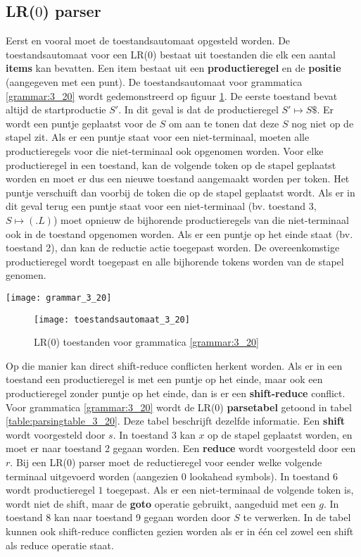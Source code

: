 \subsection{LR($0$) parser}

Eerst en vooral moet de toestandsautomaat opgesteld worden. De toestandsautomaat voor een LR(0) bestaat uit toestanden die elk een aantal \textbf{items} kan bevatten. Een item bestaat uit een \textbf{productieregel} en de \textbf{positie} (aangegeven met een punt). De toestandsautomaat voor grammatica \ref{grammar:3_20} wordt gedemonstreerd op figuur \ref{fig:toestandsautomaat_3_20}. De eerste toestand bevat altijd de startproductie $S'$. In dit geval is dat de productieregel $S' \mapsto S\$$. Er wordt een puntje geplaatst voor de $S$ om aan te tonen dat deze $S$ nog niet op de stapel zit. Als er een puntje staat voor een niet-terminaal, moeten alle productieregels voor die niet-terminaal ook opgenomen worden. Voor elke productieregel in een toestand, kan de volgende token op de stapel geplaatst worden en moet er dus een nieuwe toestand aangemaakt worden per token. Het puntje verschuift dan voorbij de token die op de stapel geplaatst wordt. Als er in dit geval terug een puntje staat voor een niet-terminaal (bv. toestand 3, $S \mapsto (.L)$) moet opnieuw de bijhorende productieregels van die niet-terminaal ook in de toestand opgenomen worden. Als er een puntje op het einde staat (bv. toestand 2), dan kan de reductie actie toegepast worden. De overeenkomstige productieregel wordt toegepast en alle bijhorende tokens worden van de stapel genomen.
\begin{grammarfigure}
	\centering
	\texttt{[image: grammar\_3\_20]}
	\caption{}
	\label{grammar:3_20}
\end{grammarfigure}
\begin{figure}[ht]
	\centering
	\texttt{[image: toestandsautomaat\_3\_20]}
	\caption{LR(0) toestanden voor grammatica \ref{grammar:3_20}}
	\label{fig:toestandsautomaat_3_20}
\end{figure}

Op die manier kan direct shift-reduce conflicten herkent worden. Als er in een toestand een productieregel is met een puntje op het einde, maar ook een productieregel zonder puntje op het einde, dan is er een \textbf{shift-reduce} conflict. Voor grammatica \ref{grammar:3_20} wordt de LR(0) \textbf{parsetabel} getoond in tabel \ref{table:parsingtable_3_20}. Deze tabel beschrijft dezelfde informatie. Een \textbf{shift} wordt voorgesteld door $s$. In toestand 3 kan $x$ op de stapel geplaatst worden, en moet er naar toestand 2 gegaan worden. Een \textbf{reduce} wordt voorgesteld door een $r$. Bij een LR(0) parser moet de reductieregel voor eender welke volgende terminaal uitgevoerd worden (aangezien 0 lookahead symbols). In toestand 6 wordt productieregel $1$ toegepast. Als er een niet-terminaal de volgende token is, wordt niet de shift, maar de \textbf{goto} operatie gebruikt, aangeduid met een $g$. In toestand 8 kan naar toestand 9 gegaan worden door $S$ te verwerken. In de tabel kunnen ook shift-reduce conflicten gezien worden als er in één cel zowel een shift als reduce operatie staat.

